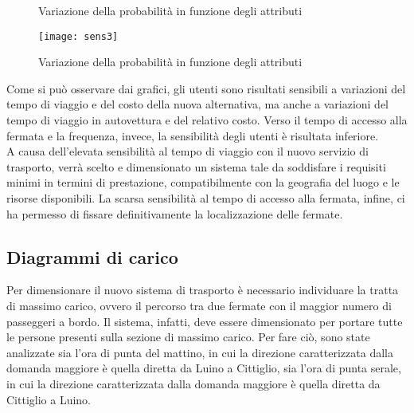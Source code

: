 \documentclass{article}
\begin{document}
\begin{figure}[H]
\centering
{}
\qquad
{}
\caption{Variazione della probabilità in funzione degli attributi}
\end{figure}
\newpage
\begin{figure}
\texttt{[image: sens3]}
\caption{Variazione della probabilità in funzione degli attributi}
\end{figure}
Come si può osservare dai grafici, gli utenti sono risultati sensibili a variazioni del tempo di viaggio e del costo della nuova alternativa, ma anche a variazioni del tempo di viaggio in autovettura e del relativo costo. Verso il tempo di accesso alla fermata e la frequenza, invece, la sensibilità degli utenti è risultata inferiore.\\
A causa dell’elevata sensibilità al tempo di viaggio con il nuovo servizio di trasporto, verrà scelto e dimensionato un sistema tale da soddisfare i requisiti minimi in termini di prestazione, compatibilmente con la geografia del luogo e le risorse disponibili. La scarsa sensibilità al tempo di accesso alla fermata, infine, ci ha permesso di fissare definitivamente la localizzazione delle fermate.
\newpage
\subsection{Diagrammi di carico}
Per dimensionare il nuovo sistema di trasporto è necessario individuare la tratta di massimo carico, ovvero il percorso tra due fermate con il maggior numero di passeggeri a bordo. Il sistema, infatti, deve essere dimensionato per portare tutte le persone presenti sulla sezione di massimo carico. Per fare ciò, sono state analizzate sia l’ora di punta del mattino, in cui la direzione caratterizzata dalla domanda maggiore è quella diretta da Luino a Cittiglio, sia l’ora di punta serale, in cui la direzione caratterizzata dalla domanda maggiore è quella diretta da Cittiglio a Luino.\\
\end{document}
